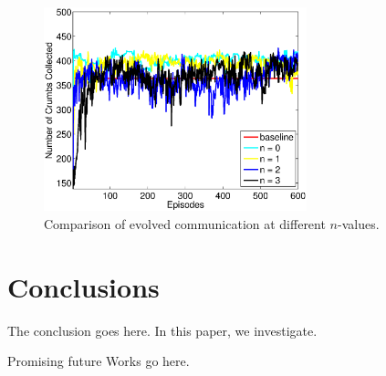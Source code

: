 \documentclass[conference]{IEEEtran}
\begin{document}
\begin{figure}[t]
\centering
\includegraphics[width=3.0in]{./figures/neroevolution/emerg.eps}
\caption{Comparison of evolved communication at different $n$-values. }
\label{neroevolution:evolved_comunication_results}
\end{figure}



\section{Conclusions} \label{conclusion}
The conclusion goes here. In this paper, we investigate.

Promising future Works go here.












\end{document}

